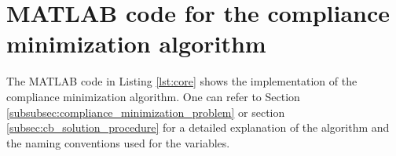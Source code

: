 \section{MATLAB code for the compliance minimization algorithm}
\label{sec:matlab_code_compliance_minimization}

The MATLAB code in Listing \ref{lst:core} shows the implementation of the compliance minimization algorithm.
One can refer to Section \ref{subsubsec:compliance_minimization_problem} or section \ref{subsec:cb_solution_procedure} for a detailed explanation of the algorithm and the naming conventions used for the variables.

